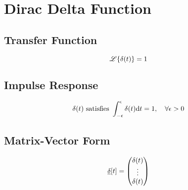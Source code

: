\section*{Dirac Delta Function}
\subsection*{Transfer Function}
\[
    \mathscr{L}\{\delta(t)\} = 1
\]

\subsection*{Impulse Response}
\[
    \delta(t) \text{ satisfies } \int_{-\epsilon}^{\epsilon} \delta(t) \mathrm{d}t = 1, \quad \forall \epsilon > 0
\]

\subsection*{Matrix-Vector Form}
\[
    \underline{\delta}[t] =
    \begin{pmatrix}
        \delta(t) \\
        \vdots \\
        \delta(t)
    \end{pmatrix}
\]